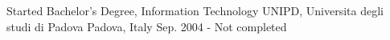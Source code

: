 
\begin{cventries}

  \cventry
    {Started Bachelor's Degree, Information Technology} %
    {UNIPD, Universita degli studi di Padova \textmd{}} %
    {Padova, Italy} %
    {Sep. 2004 - Not completed} %
    {
    }
  \vspace{-5mm}

\end{cventries}
